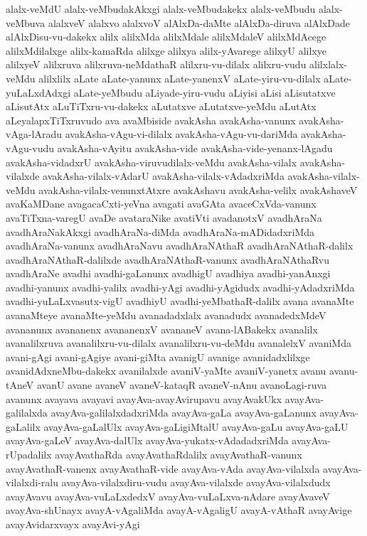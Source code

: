 {alalx-veMdU
alalx-veMbudakAkxgi
alalx-veMbudakekx
alalx-veMbudu
alalx-veMbuva
alalxveV
alalxvo
alalxvoV
alAlxDa-daMte
alAlxDa-diruva
alAlxDade
alAlxDisu-vu-dakekx
alilx
alilxMda
alilxMdale
alilxMdaleV
alilxMdAcege
alilxMdilalxge
alilx-kamaRda
alilxge
alilxya
alilx-yAvarege
alilxyU
alilxye
alilxyeV
alilxruva
alilxruva-neMdathaR
alilxru-vu-dilalx
alilxru-vudu
alilxlalx-veMdu
alilxlilx
aLate
aLate-yanunx
aLate-yanenxV
aLate-yiru-vu-dilalx
aLate-yuLaLxdAdxgi
aLate-yeMbudu
aLiyade-yiru-vudu
aLiyisi
aLisi
aLisutatxve
aLisutAtx
aLuTiTxru-vu-dakekx
aLutatxve
aLutatxve-yeMdu
aLutAtx
aLeyalapxTiTxruvudo
ava
avaMbiside
avakAsha
avakAsha-vanunx
avakAsha-vAga-lAradu
avakAsha-vAgu-vi-dilalx
avakAsha-vAgu-vu-dariMda
avakAsha-vAgu-vudu
avakAsha-vAyitu
avakAsha-vide
avakAsha-vide-yenanx-lAgadu
avakAsha-vidadxrU
avakAsha-viruvudilalx-veMdu
avakAsha-vilalx
avakAsha-vilalxde
avakAsha-vilalx-vAdarU
avakAsha-vilalx-vAdadxriMda
avakAsha-vilalx-veMdu
avakAsha-vilalx-venunxtAtxre
avakAshavu
avakAsha-velilx
avakAshaveV
avaKaMDane
avagacaCxti-yeVna
avagati
avaGAta
avaceCxVda-vanunx
avaTiTxna-varegU
avaDe
avataraNike
avatiVti
avadanotxV
avadhAraNa
avadhAraNakAkxgi
avadhAraNa-diMda
avadhAraNa-mADidadxriMda
avadhAraNa-vanunx
avadhAraNavu
avadhAraNAthaR
avadhAraNAthaR-dalilx
avadhAraNAthaR-dalilxde
avadhAraNAthaR-vanunx
avadhAraNAthaRvu
avadhAraNe
avadhi
avadhi-gaLanunx
avadhigU
avadhiya
avadhi-yanAnxgi
avadhi-yanunx
avadhi-yalilx
avadhi-yAgi
avadhi-yAgidudx
avadhi-yAdadxriMda
avadhi-yuLaLxvasutx-vigU
avadhiyU
avadhi-yeMbathaR-dalilx
avana
avanaMte
avanaMteye
avanaMte-yeMdu
avanadadxlalx
avanadudx
avanadedxMdeV
avananunx
avananenx
avananenxV
avananeV
avana-lABakekx
avanalilx
avanalilxruva
avanalilxru-vu-dilalx
avanalilxru-vu-deMdu
avanalelxV
avaniMda
avani-gAgi
avani-gAgiye
avani-giMta
avanigU
avanige
avanidadxlilxge
avanidAdxneMbu-dakekx
avanilalxde
avaniV-yaMte
avaniV-yanetx
avanu
avanu-tAneV
avanU
avane
avaneV
avaneV-kataqR
avaneV-nAnu
avanoLagi-ruva
avanunx
avayava
avayavi
avayAva-avayAvirupavu
avayAvakUkx
avayAva-galilalxda
avayAva-galilalxdadxriMda
avayAva-gaLa
avayAva-gaLanunx
avayAva-gaLalilx
avayAva-gaLalUlx
avayAva-gaLigiMtalU
avayAva-gaLu
avayAva-gaLU
avayAva-gaLeV
avayAva-dalUlx
avayAva-yukatx-vAdadadxriMda
avayAva-rUpadalilx
avayAvathaRda
avayAvathaRdalilx
avayAvathaR-vanunx
avayAvathaR-vanenx
avayAvathaR-vide
avayAva-vAda
avayAva-vilalxda
avayAva-vilalxdi-ralu
avayAva-vilalxdiru-vudu
avayAva-vilalxde
avayAva-vilalxdudx
avayAvavu
avayAva-vuLaLxdedxV
avayAva-vuLaLxva-nAdare
avayAvaveV
avayAva-shUnayx
avayA-vAgaliMda
avayA-vAgaligU
avayA-vAthaR
avayAvige
avayAvidarxvayx
avayAvi-yAgi
}
